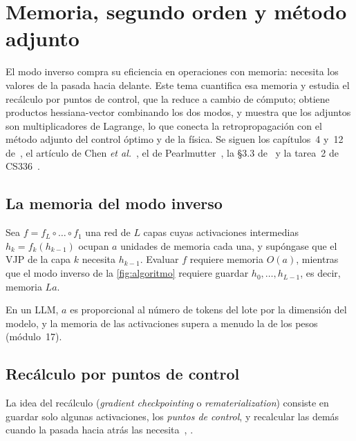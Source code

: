 \chapter{Memoria, segundo orden y método adjunto}
\label{tema:5}

El modo inverso compra su eficiencia en operaciones con memoria: necesita los valores de la pasada hacia delante. Este tema cuantifica esa memoria y estudia el recálculo por puntos de control, que la reduce a cambio de cómputo; obtiene productos hessiana-vector combinando los dos modos, y muestra que los adjuntos son multiplicadores de Lagrange, lo que conecta la retropropagación con el método adjunto del control óptimo y de la física. Se siguen los capítulos~4 y~12 de~\cite{gw}, el artículo de Chen \emph{et al.}~\cite{chen}, el de Pearlmutter~\cite{pearlmutter}, la §3.3 de~\cite{baydin} y la tarea~2 de CS336~\cite{cs336a2}.

\section{La memoria del modo inverso}

\begin{proposicion}\label{prop:memoria}
Sea $f=f_L\circ\dots\circ f_1$ una red de $L$ capas cuyas activaciones intermedias $h_k=f_k(h_{k-1})$ ocupan $a$ unidades de memoria cada una, y supóngase que el VJP de la capa $k$ necesita $h_{k-1}$. Evaluar $f$ requiere memoria $O(a)$, mientras que el modo inverso de la \cref{fig:algoritmo} requiere guardar $h_0,\dots,h_{L-1}$, es decir, memoria $La$.
\end{proposicion}

En un LLM, $a$ es proporcional al número de tokens del lote por la dimensión del modelo, y la memoria de las activaciones supera a menudo la de los pesos (módulo~17).

\section{Recálculo por puntos de control}

La idea del recálculo (\emph{gradient checkpointing} o \emph{rematerialization}) consiste en guardar solo algunas activaciones, los \emph{puntos de control}, y recalcular las demás cuando la pasada hacia atrás las necesita~\cite{chen}, \cite[cap.~12]{gw}.

